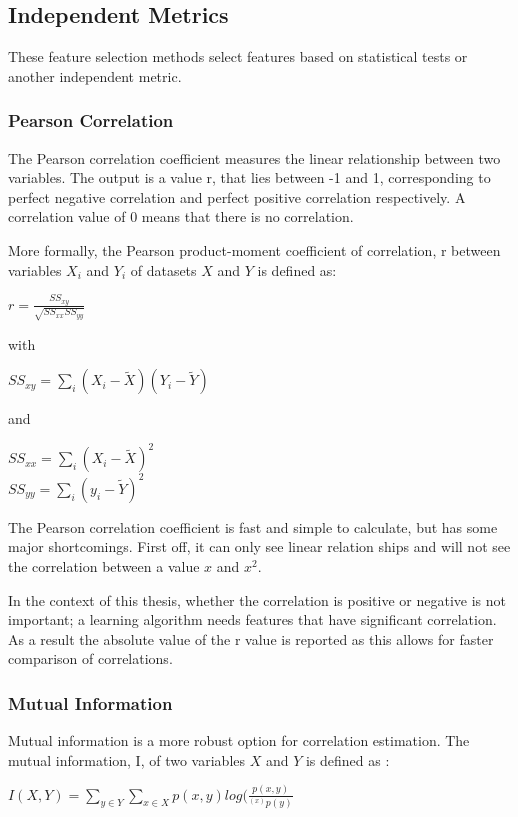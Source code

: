 \subsection{Independent Metrics}
These feature selection methods select features based on statistical tests or another independent metric. 

\subsubsection{Pearson Correlation}
The Pearson correlation coefficient measures the linear relationship between two variables. The output is a value r, that lies between -1 and 1, corresponding to perfect negative correlation and perfect positive correlation respectively. A correlation value of 0 means that there is no correlation.

\npar

More formally\citep{corrPaper}, the Pearson product-moment coefficient of correlation, r between variables $X_i$ and $Y_i$ of datasets $X$ and $Y$ is defined as:


\begin{center}
$r = \frac{SS_{xy}}{\sqrt{SS_{xx}SS_{yy}}}$
\end{center}
with
\begin{center}
$SS_{xy} = \sum\limits_i (X_i-\tilde{X})(Y_i-\tilde{Y})$
\end{center}
and
\begin{center}
$SS_{xx} = \sum\limits_i (X_i-\tilde{X})^2$ \\
$SS_{yy} = \sum\limits_i (y_i-\tilde{Y})^2$
\end{center}

\npar

The Pearson correlation coefficient is fast and simple to calculate, but has some major shortcomings. First off, it can only see linear relation ships and will not see the correlation between a value $x$ and $x^2$.

\npar

In the context of this thesis, whether the correlation is positive or negative is not important; a learning algorithm needs features that have significant correlation. As a result the absolute value of the r value is reported as this allows for faster comparison of correlations.

\subsubsection{Mutual Information}
Mutual information is a more robust option for correlation estimation. The mutual information, I, of two variables $X$ and $Y$ is defined as \citep{mutPaper}:
\begin{center}
$I(X,Y) = \sum\limits_{y\in Y} \sum\limits_{x\in X} p(x,y)log(\frac{p(x,y)}{^(x)p(y)}$
\end{center}

